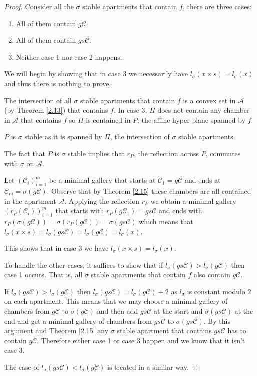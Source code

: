 \documentclass[12pt]{article}
\newcommand{\A}{\mathcal{A}}
\newcommand{\C}{\mathcal{C}}
\newcommand{\<}{\langle}
\renewcommand{\>}{\rangle}
\theoremstyle{plain}
\theoremstyle{definition}
\begin{document}
\begin{proof}


Consider all the $\sigma$ stable apartments that contain $f$, there are three cases:
\begin{enumerate}
    \item All of them contain $g\C$.
    \item All of them contain $gs\C$.
    \item Neither case 1 nor case 2 happens.
\end{enumerate}

We will begin by showing that in case 3 we necessarily have $l_\sigma(x\times s) = l_\sigma(x)$ and thus there is nothing to prove.


The intersection of all $\sigma$ stable apartments that contain $f$ is a convex set in $\A$ (by Theorem \ref{2.13}) that contains $f$. In case 3, $\Pi$ does not contain any chamber in $\A$ that contains $f$ so $\Pi$ is contained in $P$, the affine hyper-plane spanned by $f$.

 $P$ is $\sigma$ stable as it is spanned by $\Pi$, the intersection of $\sigma$ stable apartments.

The fact that $P$ is $\sigma$ stable implies that $r_P$, the reflection across $P$, commutes with $\sigma$ on $\A$.

Let $(\C_i)_{i=1}^m$ be a minimal gallery that starts at $\C_1=g\C$ and ends at $\C_m=\sigma(g\C).$ Observe that by Theorem \ref{2.15} these chambers are all contained in the apartment $\A.$ Applying the reflection $r_{P}$ we obtain a minimal gallery $(r_P(\C_i))_{i=1}^m$  that starts with $r_P(g\C_1)=gs\C$ and ends with $r_P(\sigma(g\C))=\sigma(r_P(g\C))=\sigma(gs\C)$ which means that $l_\sigma(x\times s)=l_\sigma(gs\C)=l_\sigma(g\C)=l_\sigma(x)$.

This shows that in case 3 we have $l_\sigma(x\times s) = l_\sigma(x)$. 

To handle the other cases, it suffices to show that if $l_\sigma(gs\C)>l_\sigma(g\C)$ then case 1 occurs. That is, all $\sigma$ stable apartments that contain $f$ also contain $g\C$.
        
If $l_\sigma(gs\C)>l_\sigma(g\C)$ then $l_\sigma(gs\C)=l_\sigma(g\C)+2$ as $l_\sigma$ is constant modulo $2$ on each apartment. This means that we may choose a minimal gallery of chambers from $g\C$ to $\sigma(g\C)$ and then add $gs\C$ at the start and $\sigma(gs\C)$ at the end and get a minimal gallery of chambers from $gs\C$ to $\sigma(gs\C)$. By this argument and Theorem \ref{2.15} any $\sigma$ stable apartment that contains $gs\C$ has to contain $g\C$. Therefore either case 1 or case 3 happen and we know that it isn't case 3.

The case of $l_\sigma(gs\C)<l_\sigma(g\C)$ is treated in a similar way.

\end{proof}
\end{document}
